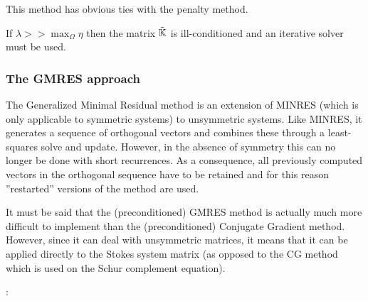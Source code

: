 \begin{remark} 
This method has obvious ties with the penalty method. 
\end{remark}

\begin{remark} 
If $\lambda >> \max_\Omega{\eta}$ then the matrix $\tilde{{\mathbb{K}}}$ is ill-conditioned and an iterative solver must be used.
\end{remark}




\subsubsection{The GMRES approach}

The Generalized Minimal Residual method \cite{sasc86} 
is an extension of MINRES (which is only applicable to symmetric systems) to unsymmetric systems. 
Like MINRES, it generates a sequence of orthogonal vectors and 
combines these through a least-squares solve and update. However, 
in the absence of symmetry this can no longer be done with short recurrences. As a consequence, 
all previously computed vectors in the orthogonal sequence have to be retained and 
for this reason ''restarted'' versions of the method are used.

It must be said that the (preconditioned) GMRES method is actually much more difficult to implement 
than the (preconditioned) Conjugate Gradient method.
However, since it can deal with unsymmetric matrices, it means that it can be applied 
directly to the Stokes system matrix (as opposed to the CG method which is used on the Schur complement
equation).

 

\Literature: \cite[p208]{eijkhout} \cite{saad} \cite{babc94} \cite{ayac03}







